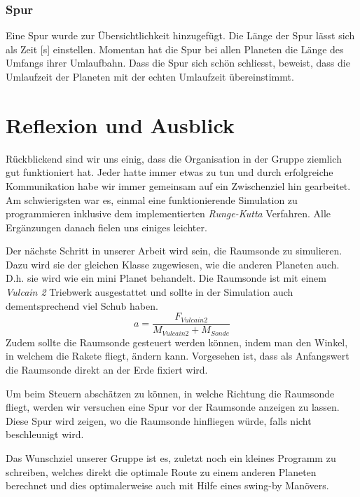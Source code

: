 \documentclass{article}
\begin{document}
\subsubsection{Spur}
Eine Spur wurde zur Übersichtlichkeit hinzugefügt. Die Länge der Spur lässt sich als Zeit [s] einstellen. Momentan hat die Spur bei allen Planeten die Länge des Umfangs ihrer Umlaufbahn. Dass die Spur sich schön schliesst, beweist, dass die Umlaufzeit der Planeten mit der echten Umlaufzeit übereinstimmt.


\section{Reflexion und Ausblick}
Rückblickend sind wir uns einig, dass die Organisation in der Gruppe ziemlich gut funktioniert hat. Jeder hatte immer etwas zu tun und durch erfolgreiche Kommunikation habe wir immer gemeinsam auf ein Zwischenziel hin gearbeitet. Am schwierigsten war es, einmal eine funktionierende Simulation zu programmieren inklusive dem implementierten \textit{Runge-Kutta} Verfahren. Alle Ergänzungen danach fielen uns einiges leichter. 


Der nächste Schritt in unserer Arbeit wird sein, die Raumsonde zu simulieren. Dazu wird sie der gleichen Klasse zugewiesen, wie die anderen Planeten auch. 
D.h. sie wird wie ein mini Planet behandelt. Die Raumsonde ist mit einem \textit{Vulcain 2} Triebwerk ausgestattet und sollte in der Simulation auch dementsprechend viel Schub haben. 
$$ a = \frac{F_{Vulcain2}}{M_{Vulcain2} + M_{Sonde}} $$
Zudem sollte die Raumsonde gesteuert werden können, indem man den Winkel, in welchem die Rakete fliegt, ändern kann. Vorgesehen ist, dass als Anfangswert die Raumsonde direkt an der Erde fixiert wird. 

Um beim Steuern abschätzen zu können, in welche Richtung die Raumsonde fliegt, werden wir versuchen eine Spur vor der Raumsonde anzeigen zu lassen. Diese Spur wird zeigen, wo die Raumsonde hinfliegen würde, falls nicht beschleunigt wird.

Das Wunschziel unserer Gruppe ist es, zuletzt noch ein kleines Programm zu schreiben, welches direkt die optimale Route zu einem anderen Planeten berechnet und dies optimalerweise auch mit Hilfe eines swing-by Manövers.
\end{document}
